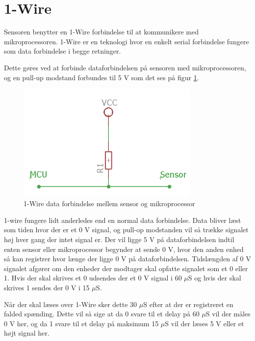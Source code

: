\section{1-Wire}
Sensoren benytter en 1-Wire forbindelse til at kommunikere med mikroprocessoren. 1-Wire er en teknologi hvor en  enkelt serial forbindelse fungere som data forbindelse i begge retninger. 

Dette gøres ved at forbinde dataforbindelsen på sensoren med mikroprocessoren, og en pull-up modstand forbundes til 5 V som det ses på figur \ref{one_wire_schematic}. 


\begin{figure}[h!]
  \centering
  \includegraphics[width=0.8\textwidth]{figures/onewire_eksempel.png}
  \caption{1-Wire data forbindelse mellem sensor og mikroprocessor}
  \label{one_wire_schematic}
\end{figure}

1-wire fungere lidt anderledes end en normal data forbindelse. Data bliver læst som tiden hvor der er et 0 V signal, og pull-op modstanden vil så trække signalet høj hver gang der intet signal er. Der vil ligge 5 V på dataforbindelsen indtil enten sensor eller mikroprocessor begynder at sende 0 V, hvor den anden enhed så kan registrer hvor længe der ligge 0 V på dataforbindelsen. Tidslængden af 0 V signalet afgører om den enheder der modtager skal opfatte signalet som et 0 eller 1. Hvis der skal skrives et 0 udsendes der et 0 V signal i 60 $\mu$S og hvis der skal skrives 1 sendes der 0 V i 15 $\mu$S. 

Når der skal læses over 1-Wire sker dette 30 $\mu$S efter at der er registreret en falded spænding. Dette vil så sige at da 0 svare til et delay på 60 $\mu$S vil der måles 0 V her, og da 1 svare til et delay på maksimum 15 $\mu$S vil der læses 5 V eller et højt signal her.


